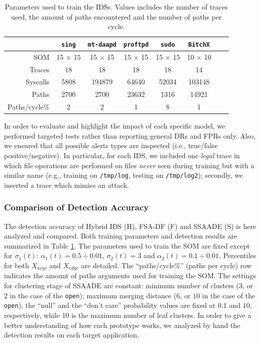 \begin{table}[p]
  \centering\footnotesize
  \begin{tabular*}{\columnwidth}{@{\extracolsep{\fill}}rccccccc}

    \toprule

    & \texttt{sing} & \texttt{mt-daapd} & \texttt{proftpd} & \texttt{sudo} & \multicolumn{1}{c}{\texttt{BitchX}}\\

    \midrule

    SOM & 15 $\times$ 15 & 15 $\times$ 15 & 15 $\times$ 15 & 15 $\times$ 15 & 10 $\times$ 10\\
    Traces & 18 & 18 & 18 & 18 & 14\\
    Syscalls & 5808 & 194879 & 64640 & 52034 & 103148\\
    Paths & 2700 & 2700 & 23632 & 1316 & 14921 \\
    Paths/cycle\% & 2 & 2 & 1 & 8 & 1 \\
    \bottomrule
  \end{tabular*}
  
  \caption{Parameters used to train the \acp{IDS}. Values includes the number of traces used, the amount of paths encountered and the number of paths per cycle.}
  \label{tab:testing}
\end{table}

In order to evaluate and highlight the impact of each specific model, we performed targeted tests rather than reporting general \acp{DR} and \acp{FPR} only. Also, we ensured that all possible alerts types are inspected (i.e., true/false positive/negative). In particular, for each \ac{IDS}, we included one \emph{legal} trace in which file operations are performed on files \emph{never} seen during training but with a similar name (e.g., training on \texttt{/tmp/log}, testing on \texttt{/tmp/log2}); secondly, we inserted a trace which mimics an attack.

\subsubsection{Comparison of Detection Accuracy}
\label{host:improving:test_hybrid}
The detection accuracy of Hybrid IDS (H), FSA-DF (F) and \ac{SSAADE} (S) is here analyzed and compared. Both training parameters and detection results are summarized in Table \ref{tab:testing}. The parameters used to train the \ac{SOM} are fixed except for $\sigma_{1}(t)$: $\alpha_{1}(t) = 0.5\div0.01$, $\sigma_{2}(t) = 3$ and $\alpha_{2}(t) = 0.1\div0.01$. Percentiles for both $X_{args}$ and $X_{edge}$ are detailed. The ``paths/cycle\%'' (paths per cycle) row indicates the amount of paths arguments used for training the \ac{SOM}. The settings for clustering stage of \ac{SSAADE} are constant: minimum number of clusters ($3$, or $2$ in the case of the \texttt{open}); maximum merging distance ($6$, or $10$ in the case of the \texttt{open}); the ``null'' and the ``don't care'' probability values are fixed at $0.1$ and $10$, respectively, while $10$ is the maximum number of leaf clusters. In order to give a better understanding of how each prototype works, we analyzed by hand the detection results on each target application.

